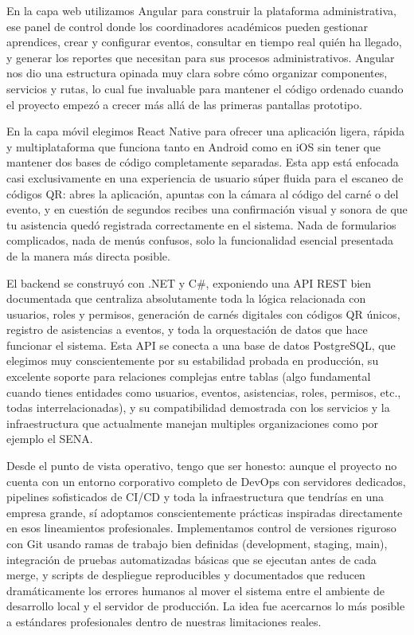 En la capa web utilizamos Angular para construir la plataforma administrativa, ese panel de control donde los coordinadores académicos pueden gestionar aprendices, crear y configurar eventos, consultar en tiempo real quién ha llegado, y generar los reportes que necesitan para sus procesos administrativos. Angular nos dio una estructura opinada muy clara sobre cómo organizar componentes, servicios y rutas, lo cual fue invaluable para mantener el código ordenado cuando el proyecto empezó a crecer más allá de las primeras pantallas prototipo.

En la capa móvil elegimos React Native para ofrecer una aplicación ligera, rápida y multiplataforma que funciona tanto en Android como en iOS sin tener que mantener dos bases de código completamente separadas. Esta app está enfocada casi exclusivamente en una experiencia de usuario súper fluida para el escaneo de códigos QR: abres la aplicación, apuntas con la cámara al código del carné o del evento, y en cuestión de segundos recibes una confirmación visual y sonora de que tu asistencia quedó registrada correctamente en el sistema. Nada de formularios complicados, nada de menús confusos, solo la funcionalidad esencial presentada de la manera más directa posible.

El backend se construyó con .NET y C\#, exponiendo una API REST bien documentada que centraliza absolutamente toda la lógica relacionada con usuarios, roles y permisos, generación de carnés digitales con códigos QR únicos, registro de asistencias a eventos, y toda la orquestación de datos que hace funcionar el sistema. Esta API se conecta a una base de datos PostgreSQL, que elegimos muy conscientemente por su estabilidad probada en producción, su excelente soporte para relaciones complejas entre tablas (algo fundamental cuando tienes entidades como usuarios, eventos, asistencias, roles, permisos, etc., todas interrelacionadas), y su compatibilidad demostrada con los servicios y la infraestructura que actualmente manejan multiples organizaciones como por ejemplo el SENA.

Desde el punto de vista operativo, tengo que ser honesto: aunque el proyecto no cuenta con un entorno corporativo completo de DevOps con servidores dedicados, pipelines sofisticados de CI/CD y toda la infraestructura que tendrías en una empresa grande, sí adoptamos conscientemente prácticas inspiradas directamente en esos lineamientos profesionales. Implementamos control de versiones riguroso con Git usando ramas de trabajo bien definidas (development, staging, main), integración de pruebas automatizadas básicas que se ejecutan antes de cada merge, y scripts de despliegue reproducibles y documentados que reducen dramáticamente los errores humanos al mover el sistema entre el ambiente de desarrollo local y el servidor de producción. La idea fue acercarnos lo más posible a estándares profesionales dentro de nuestras limitaciones reales.

